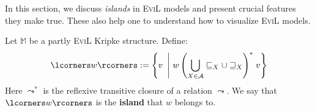 In this section, we discuss \emph{islands} in \textsc{EviL} models and
present crucial features they make true.  These also help one to
understand how to visualize \textsc{EviL} models.


\begin{mydef}Let $\mathbb{M}$ be a partly \textsc{EviL} Kripke structure.  Define:
\[ \lcorners w\rcorners := \left\{ v\ \left|\ w \left(\bigcup_{X \in
        \mathcal{A}}\sqsubseteq_X \cup \sqsupseteq_X\right)^\ast\right. v
     \right\}\]
Here $\leadsto^\ast$ is the reflexive transitive closure of a relation
$\leadsto$.  We say that $\lcorners w \rcorners$ is the \textbf{island} that
$w$ belongs to.
\end{mydef}

